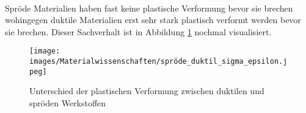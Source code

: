 \documentclass[11pt,a4paper]{article}
\numberwithin{equation}{section}
\numberwithin{figure}{section}
\begin{document}
\\
\begin{addmargin}[25pt]{0pt}
Spröde Materialien haben fast keine plastische Verformung bevor sie brechen wohingegen duktile Materialien erst sehr stark plastisch verformt werden bevor sie brechen. Dieser Sachverhalt ist in Abbildung \ref{fig:duktil_spröde} nochmal visualisiert.\\
\begin{figure}[h]
    \centering
    \texttt{[image: images/Materialwissenschaften/spröde\_duktil\_sigma\_epsilon.jpeg]}
    \caption{Unterschied der plastischen Verformung zwischen duktilen und spröden Werkstoffen}
    \label{fig:duktil_spröde}
\end{figure}
\end{addmargin}
\end{document}
